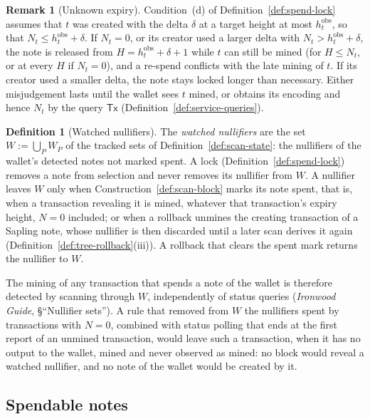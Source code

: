 \documentclass[11pt,a4paper]{article}
\theoremstyle{definition}
\newtheorem{definition}[theorem]{Definition}
\newtheorem{remark}[theorem]{Remark}
\begin{document}
\begin{remark}[Unknown expiry]\label{rem:spend-unknown-expiry}
Condition~(d) of Definition~\ref{def:spend-lock} assumes that $t$ was
created with the delta $\delta$ at a target height at most
$h^{\mathrm{obs}}_t$, so that $N_t \le h^{\mathrm{obs}}_t + \delta$. If
$N_t = 0$, or its creator used a larger delta with $N_t >
h^{\mathrm{obs}}_t + \delta$, the note is released from $H =
h^{\mathrm{obs}}_t + \delta + 1$ while $t$ can still be mined (for $H \le
N_t$, or at every $H$ if $N_t = 0$), and a re-spend conflicts with the late
mining of $t$. If its creator used a
smaller delta, the note stays locked longer than necessary. Either
misjudgement lasts until the wallet sees $t$ mined, or obtains its encoding
and hence $N_t$ by the query $\mathsf{Tx}$
(Definition~\ref{def:service-queries}).
\end{remark}

\begin{definition}[Watched nullifiers]\label{def:spend-watched}
The \emph{watched nullifiers} are the set $W := \bigcup_P W_P$ of the
tracked sets of Definition~\ref{def:scan-state}: the nullifiers of the
wallet's detected notes not marked spent. A lock
(Definition~\ref{def:spend-lock}) removes a note from selection and never
removes its nullifier from $W$. A nullifier leaves $W$ only when
Construction~\ref{def:scan-block} marks its note spent, that is, when a
transaction revealing it is mined, whatever that transaction's expiry
height, $N = 0$ included; or when a rollback unmines the creating
transaction of a Sapling note, whose nullifier is then discarded until a
later scan derives it again (Definition~\ref{def:tree-rollback}(iii)). A
rollback that clears the spent mark returns the nullifier to $W$.
\end{definition}

The mining of any transaction that spends a note of the wallet is therefore
detected by scanning through $W$, independently of status queries
(\emph{Ironwood Guide}, \S``Nullifier sets''). A rule that removed from $W$
the nullifiers spent by transactions with $N = 0$, combined with status
polling that ends at the first report of an unmined transaction, would
leave such a transaction, when it has no output to the wallet, mined and
never observed as mined: no block would reveal a watched nullifier, and no
note of the wallet would be created by it.

\subsection{Spendable notes}\label{sec:spend-categories}
\end{document}
